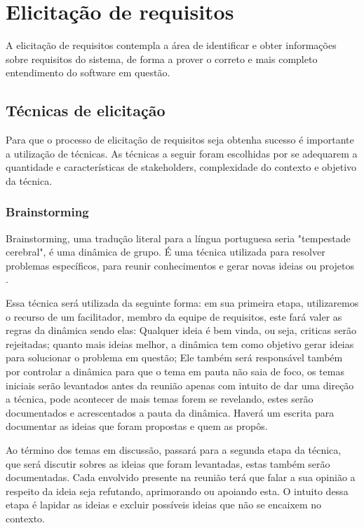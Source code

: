 \chapter[Elicitação de requisitos]{Elicitação de requisitos}
A elicitação de requisitos contempla a área de identificar e obter informações sobre requisitos do sistema, de forma a prover o correto e mais completo entendimento do software em questão.

\section{Técnicas de elicitação}
       
Para que o processo de elicitação de requisitos seja obtenha sucesso é importante a utilização de técnicas. As técnicas a seguir foram escolhidas por se adequarem a quantidade e características de stakeholders, complexidade do contexto e objetivo da técnica. 

\subsection{Brainstorming}
Brainstorming, uma tradução literal para a língua portuguesa seria "tempestade cerebral", é uma dinâmica de grupo. É uma técnica utilizada para resolver problemas específicos, para reunir conhecimentos e gerar novas ideias ou projetos \cite{leffingwell2011}.

Essa técnica será utilizada da seguinte forma: em sua primeira etapa, utilizaremos o recurso de um facilitador, membro da equipe de requisitos, este fará valer as regras da dinâmica sendo elas: Qualquer ideia é bem vinda, ou seja, criticas serão rejeitadas; quanto mais ideias melhor, a dinâmica tem como objetivo gerar ideias para solucionar o problema em questão; Ele também será responsável também por controlar a dinâmica para que o tema em pauta não saia de foco, os temas iniciais serão levantados antes da reunião apenas com intuito de dar uma direção a técnica, pode acontecer de mais temas forem se revelando, estes serão documentados e acrescentados a pauta da dinâmica. Haverá um escrita para documentar as ideias que foram propostas e quem as propôs.

Ao término dos temas em discussão, passará para a segunda etapa da técnica, que será discutir sobres as ideias que foram levantadas, estas também serão documentadas. Cada envolvido presente na reunião terá que falar a sua opinião a respeito da ideia seja refutando,  aprimorando ou apoiando esta. O intuito dessa etapa é lapidar as ideias e excluir possíveis ideias que não se encaixem no contexto. 

